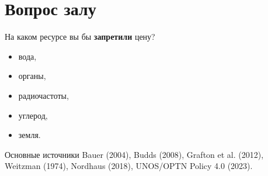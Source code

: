 \documentclass[12pt]{article}
\begin{document}
\section{Вопрос залу}

На каком ресурсе вы бы \textbf{запретили} цену?
\begin{itemize}
\item вода,
\item органы,
\item радиочастоты,
\item углерод,
\item земля.
\end{itemize}

\vspace{1cm}
\begin{tcolorbox}{Основные источники}
Bauer (2004), Budds (2008), Grafton et al. (2012), Weitzman (1974), Nordhaus (2018), UNOS/OPTN Policy 4.0 (2023).
\end{tcolorbox}

\printbibliography
\end{document}
